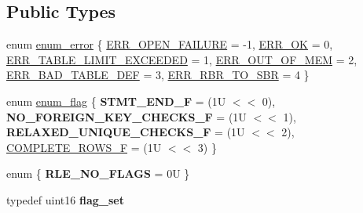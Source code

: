 \subsection*{Public Types}
\begin{DoxyCompactItemize}
\item 
enum \mbox{\hyperlink{classOld__rows__log__event_a7ef5d5a72b26be925a98b215280cffd5}{enum\+\_\+error}} \{ \newline
\mbox{\hyperlink{classOld__rows__log__event_a7ef5d5a72b26be925a98b215280cffd5ac5f446c767142601204d7adeb44a733c}{E\+R\+R\+\_\+\+O\+P\+E\+N\+\_\+\+F\+A\+I\+L\+U\+RE}} = -\/1, 
\mbox{\hyperlink{classOld__rows__log__event_a7ef5d5a72b26be925a98b215280cffd5aeae393ba6546d18755f132adc2c48265}{E\+R\+R\+\_\+\+OK}} = 0, 
\mbox{\hyperlink{classOld__rows__log__event_a7ef5d5a72b26be925a98b215280cffd5a56aae14e3798b7e285b4734b737b0f01}{E\+R\+R\+\_\+\+T\+A\+B\+L\+E\+\_\+\+L\+I\+M\+I\+T\+\_\+\+E\+X\+C\+E\+E\+D\+ED}} = 1, 
\mbox{\hyperlink{classOld__rows__log__event_a7ef5d5a72b26be925a98b215280cffd5a1012aefd3676e62e446cb3e6215b228b}{E\+R\+R\+\_\+\+O\+U\+T\+\_\+\+O\+F\+\_\+\+M\+EM}} = 2, 
\newline
\mbox{\hyperlink{classOld__rows__log__event_a7ef5d5a72b26be925a98b215280cffd5ad9a543c12bcf9ba12a94ced10bf472bf}{E\+R\+R\+\_\+\+B\+A\+D\+\_\+\+T\+A\+B\+L\+E\+\_\+\+D\+EF}} = 3, 
\mbox{\hyperlink{classOld__rows__log__event_a7ef5d5a72b26be925a98b215280cffd5ace4e56a8a23dc552e8e3adf90ffb888a}{E\+R\+R\+\_\+\+R\+B\+R\+\_\+\+T\+O\+\_\+\+S\+BR}} = 4
 \}
\item 
enum \mbox{\hyperlink{classOld__rows__log__event_a6f71a354ccd015c0d1c671be62de60c8}{enum\+\_\+flag}} \{ {\bfseries S\+T\+M\+T\+\_\+\+E\+N\+D\+\_\+F} = (1U $<$$<$ 0), 
{\bfseries N\+O\+\_\+\+F\+O\+R\+E\+I\+G\+N\+\_\+\+K\+E\+Y\+\_\+\+C\+H\+E\+C\+K\+S\+\_\+F} = (1U $<$$<$ 1), 
{\bfseries R\+E\+L\+A\+X\+E\+D\+\_\+\+U\+N\+I\+Q\+U\+E\+\_\+\+C\+H\+E\+C\+K\+S\+\_\+F} = (1U $<$$<$ 2), 
\mbox{\hyperlink{classOld__rows__log__event_a6f71a354ccd015c0d1c671be62de60c8acfc94e335b8a4f804f4122be6bd78b2f}{C\+O\+M\+P\+L\+E\+T\+E\+\_\+\+R\+O\+W\+S\+\_\+F}} = (1U $<$$<$ 3)
 \}
\item 
\mbox{\label{classOld__rows__log__event_adc652efb697ab4c171e206544104dc6e}} 
enum \{ {\bfseries R\+L\+E\+\_\+\+N\+O\+\_\+\+F\+L\+A\+GS} = 0U
 \}
\item 
\mbox{\label{classOld__rows__log__event_ab55dcc20a50b0803616b4bfff19c5624}} 
typedef uint16 {\bfseries flag\+\_\+set}
\end{DoxyCompactItemize}
